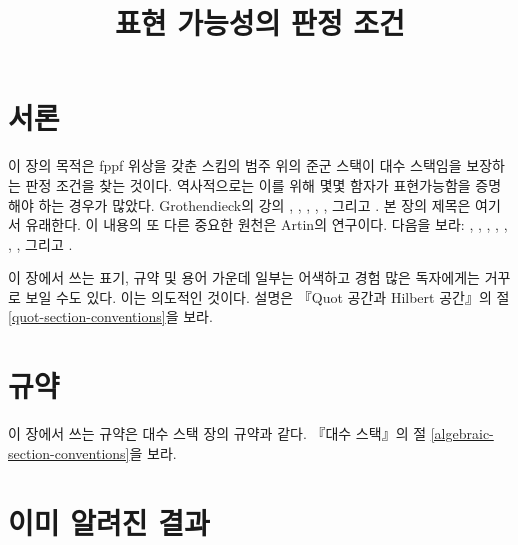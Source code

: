 



\title{표현 가능성의 판정 조건}

\maketitle

\label{section-phantom}

\tableofcontents




\section{서론}
\label{section-introduction}

\noindent
이 장의 목적은 fppf 위상을 갖춘 스킴의 범주 위의 준군 스택이
대수 스택임을 보장하는 판정 조건을 찾는 것이다. 역사적으로는 이를 위해
몇몇 함자가 표현가능함을 증명해야 하는 경우가 많았다. Grothendieck의 강의
\cite{Gr-I},
\cite{Gr-II},
\cite{Gr-III},
\cite{Gr-IV},
\cite{Gr-V}, 그리고
\cite{Gr-VI}.
본 장의 제목은 여기서 유래한다. 이 내용의 또 다른 중요한 원천은 Artin의
연구이다. 다음을 보라:
\cite{ArtinI},
\cite{ArtinII},
\cite{Artin-Theorem-Representability},
\cite{Artin-Construction-Techniques},
\cite{Artin-Algebraic-Spaces},
\cite{Artin-Algebraic-Approximation},
\cite{Artin-Implicit-Function}, 그리고
\cite{ArtinVersal}.

\medskip\noindent
이 장에서 쓰는 표기, 규약 및 용어 가운데 일부는 어색하고 경험 많은
독자에게는 거꾸로 보일 수도 있다. 이는 의도적인 것이다.
설명은 『Quot 공간과 Hilbert 공간』의 절
\ref{quot-section-conventions}을 보라.



\section{규약}
\label{section-conventions}

\noindent
이 장에서 쓰는 규약은 대수 스택 장의 규약과 같다. 『대수 스택』의 절
\ref{algebraic-section-conventions}을 보라.




\section{이미 알려진 결과}
\label{section-done-so-far}

